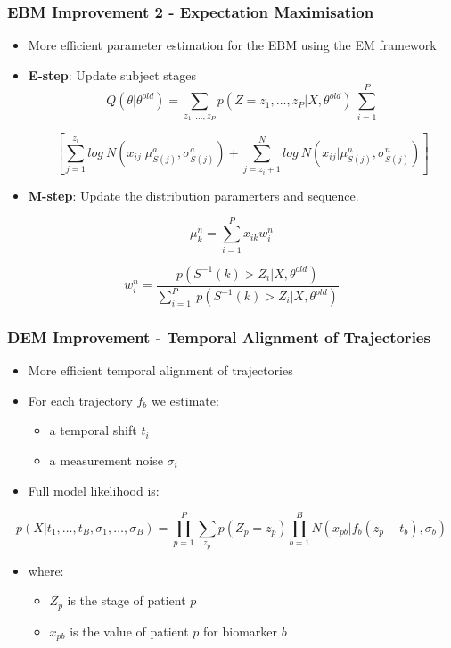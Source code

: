 \documentclass[10pt,xcolor=table]{beamer}
\begin{document}
\begin{frame}
\frametitle{EBM Improvement 2 - Expectation Maximisation}

\begin{itemize}
 \item More efficient parameter estimation for the EBM using the EM framework
 \item \textbf{E-step}: Update subject stages
 \vspace{-0.5em}
 $$ Q(\theta | \theta^{old}) = \sum_{z_1, \dots, z_P}  p(Z = z_1, \dots, z_P |X, \theta^{old})\ \sum_{i=1}^{P}$$

$$  \left[ \sum_{j=1}^{z_i} log\ N(x_{ij}|\mu_{S(j)}^a, \sigma_{S(j)}^a) + \sum_{j=z_i + 1}^N log\ N(x_{ij}|\mu_{S(j)}^n, \sigma_{S(j)}^n) \right] $$

 \item \textbf{M-step}: Update the distribution paramerters and sequence. 
 \end{itemize}
 \vspace{-0.5em}
 $$ \mu_k^n = \sum_{i=1}^P x_{ik} w_i^n$$

$$w_i^n = \frac{p(S^{-1}(k) > Z_i | X, \theta^{old})}{\sum_{i=1}^P \ p(S^{-1}(k) > Z_i | X, \theta^{old})}$$

\end{frame}


\begin{frame}
\frametitle{DEM Improvement - Temporal Alignment of Trajectories}

\begin{itemize}
 \item More efficient temporal alignment of trajectories
 \item For each trajectory $f_b$ we estimate:
 \begin{itemize}
  \item a temporal shift $t_i$
  \item a measurement noise $\sigma_i$
 \end{itemize}
 \item Full model likelihood is:
\end{itemize}

 
$$ p(X| t_1, \dots, t_B, \sigma_1, \dots , \sigma_B) = \prod_{p=1}^{P} \sum_{z_p} p(Z_p = z_p) \prod_{b=1}^{B}  N(x_{pb}|f_b(z_p-t_b), \sigma_b)$$

\begin{itemize}
 \item where:
\begin{itemize}
 \item $Z_p$ is the stage of patient $p$ 
 \item $x_{pb}$ is the value of patient $p$ for biomarker $b$
\end{itemize}
\end{itemize}


\end{frame}
\end{document}
